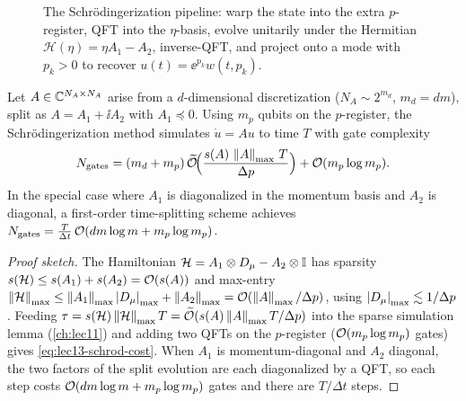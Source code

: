 \begin{figure}[ht]
  \centering
  \caption{The Schr\"odingerization pipeline: warp the state into the extra $p$-register,
    QFT into the $\eta$-basis, evolve unitarily under the Hermitian $\mathcal H(\eta)=\eta A_1
    -A_2$, inverse-QFT, and project onto a mode with $p_k>0$ to recover
    $u(t)=\ee^{p_k}w(t,p_k)$.}
  \label{fig:lec13-schrod-schematic}
\end{figure}

\begin{theorem}
\label{thm:lec13-schrod-cost}
Let $A\in\mathbb{C}^{N_A\times N_A}$ arise from a $d$-dimensional discretization ($N_A\sim2^{m_d}$,
$m_d=dm$), split as $A=A_1+\ii A_2$ with $A_1\preceq0$. Using $m_p$ qubits on the $p$-register,
the Schr\"odingerization method simulates $\dot u=Au$ to time $T$ with gate complexity
\begin{equation}
  N_{\mathrm{gates}}=(m_d+m_p)\,\widetilde{\mathcal{O}}\!\Bigl(\frac{s(A)\,\left\lVert A \right\rVert_{\max}\,T}{\Delta p}\Bigr)
   +\mathcal{O}(m_p\log m_p).
  \label{eq:lec13-schrod-cost}
\end{equation}
In the special case where $A_1$ is diagonalized in the momentum basis and $A_2$ is diagonal, a
first-order time-splitting scheme achieves
$N_{\mathrm{gates}}=\tfrac{T}{\Delta t}\,\mathcal{O}(dm\log m+m_p\log m_p)$.
\end{theorem}

\begin{proof}[Proof sketch]
The Hamiltonian $\mathcal H=A_1\otimes D_\mu-A_2\otimes\mathbb{I}$ has sparsity
$s(\mathcal H)\le s(A_1)+s(A_2)=\mathcal{O}(s(A))$ and max-entry $\left\lVert \mathcal H \right\rVert_{\max}\le
\left\lVert A_1 \right\rVert_{\max}\left\lvert D_\mu \right\rvert_{\max}+\left\lVert A_2 \right\rVert_{\max}=\mathcal{O}(\left\lVert A \right\rVert_{\max}/\Delta p)$, using
$\left\lvert D_\mu \right\rvert_{\max}\lesssim1/\Delta p$. Feeding $\tau=s(\mathcal H)\left\lVert \mathcal H \right\rVert_{\max}T
=\widetilde{\mathcal{O}}(s(A)\left\lVert A \right\rVert_{\max}T/\Delta p)$ into the sparse simulation lemma
(\cref{ch:lec11}) and adding two QFTs on the $p$-register ($\mathcal{O}(m_p\log m_p)$ gates) gives
\eqref{eq:lec13-schrod-cost}. When $A_1$ is momentum-diagonal and $A_2$ diagonal, the two
factors of the split evolution are each diagonalized by a QFT, so each step costs
$\mathcal{O}(dm\log m+m_p\log m_p)$ gates and there are $T/\Delta t$ steps.
\end{proof}

